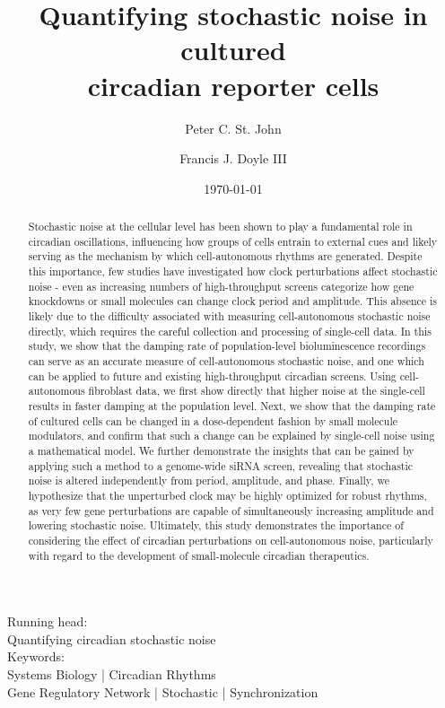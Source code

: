 \documentclass[11pt, letterpaper]{article}
\begin{document}
\title{Quantifying stochastic noise in cultured\\ circadian reporter cells}
\author[1]{Peter C. St. John}
\author[1,*]{Francis J. Doyle III}
\date{\today}
\maketitle

\begin{center}
Running head:\\ {Quantifying circadian stochastic noise} \\[1ex]
Keywords:\\ Systems Biology | Circadian Rhythms \\ Gene
Regulatory Network | Stochastic | Synchronization
\end{center}

\pagebreak
\begin{abstract}
Stochastic noise at the cellular level has been shown to play a fundamental role in circadian oscillations, influencing how groups of cells entrain to external cues and likely serving as the mechanism by which cell-autonomous rhythms are generated.
Despite this importance, few studies have investigated how clock perturbations affect stochastic noise - even as increasing numbers of high-throughput screens categorize how gene knockdowns or small molecules can change clock period and amplitude.
This absence is likely due to the difficulty associated with measuring cell-autonomous stochastic noise directly, which requires the careful collection and processing of single-cell data.
In this study, we show that the damping rate of population-level bioluminescence recordings can serve as an accurate measure of cell-autonomous stochastic noise, and one which can be applied to future and existing high-throughput circadian screens.
Using cell-autonomous fibroblast data, we first show directly that higher noise at the single-cell results in faster damping at the population level.
Next, we show that the damping rate of cultured cells can be changed in a dose-dependent fashion by small molecule modulators, and confirm that such a change can be explained by single-cell noise using a mathematical model.
We further demonstrate the insights that can be gained by applying such a method to a genome-wide siRNA screen, revealing that stochastic noise is altered independently from period, amplitude, and phase.
Finally, we hypothesize that the unperturbed clock may be highly optimized for robust rhythms, as very few gene perturbations are capable of simultaneously increasing amplitude and lowering stochastic noise.
Ultimately, this study demonstrates the importance of considering the effect of circadian perturbations on cell-autonomous noise, particularly with regard to the development of small-molecule circadian therapeutics.
\end{abstract}
\end{document}
